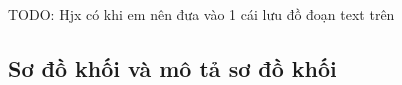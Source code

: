 {TODO: Hjx có khi em nên đưa vào 1 cái lưu đồ đoạn text trên

\subsection{Sơ đồ khối và mô tả sơ đồ khối}





}

